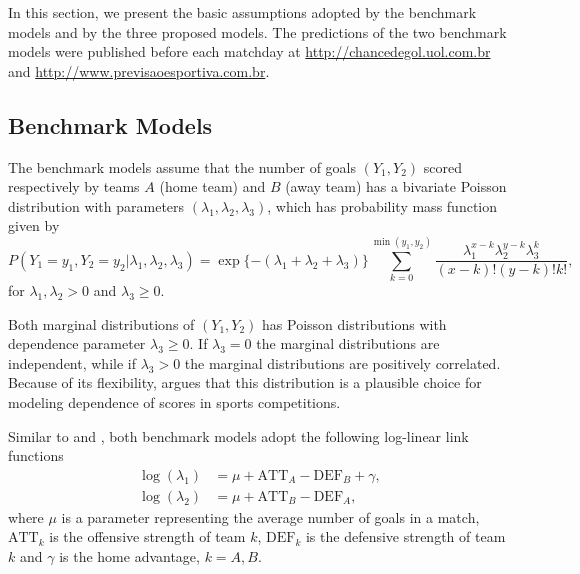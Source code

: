 \documentclass[journal,article,accept,moreauthors,pdftex,12pt,a4paper]{mdpi}
\begin{document}
    In this section, we present the basic assumptions adopted by the benchmark models and
    by the three proposed models. The predictions of the
    two benchmark models were published before each matchday at
    \url{http://chancedegol.uol.com.br} and
    \url{http://www.previsaoesportiva.com.br}.

    \subsection{Benchmark Models}
    \label{sec::Benchmark}

    The benchmark models assume that the number of goals $(Y_1, Y_2)$ scored respectively by teams $A$ (home team) and $B$ (away
    team) has a bivariate Poisson distribution \citep{Holgate64} with parameters $(\lambda_1, \lambda_2, \lambda_3)$,
    which has probability mass function given by
\begin{equation*}
P(Y_1 = y_1, Y_2 = y_2 | \lambda_1, \lambda_2, \lambda_3) =
\exp\{-(\lambda_1 + \lambda_2 + \lambda_3)\}
 \sum_{k = 0}^{\min(y_1, y_2)} \dfrac{\lambda_1^{x - k} \lambda_2^{y - k} \lambda_3^k}{(x-k)!(y -
 k)!k!}, \label{eq::pois.biv}
\end{equation*}
for $\lambda_1, \lambda_2 > 0$ and $\lambda_3 \geq 0$.

Both marginal distributions of $(Y_1, Y_2)$ has Poisson
distributions with dependence parameter $\lambda_3 \geq 0$. If
$\lambda_3 = 0$ the marginal distributions are independent, while if
$\lambda_3 > 0$ the marginal distributions are positively
correlated. Because of its flexibility, \cite{Karlis2003} argues
that this distribution is a plausible choice for modeling dependence
of scores in sports competitions.


Similar to \cite{Lee97} and \cite{Karlis2003}, both benchmark models
adopt the following log-linear link functions
\begin{align*}
\log(\lambda_1) &= \mu + \text{ATT}_A - \text{DEF}_B + \gamma, \\
\log(\lambda_2) &= \mu + \text{ATT}_B - \text{DEF}_A,
\end{align*}
where $\mu$ is a parameter representing the average number of goals
in a match, $\text{ATT}_k$ is the offensive strength of team $k$,
$\text{DEF}_k$ is the defensive strength of team $k$ and $\gamma$ is
the home advantage, $k = A, B$.
\end{document}
